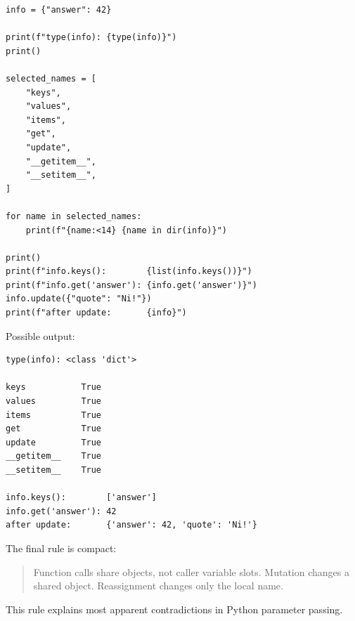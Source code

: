 \begin{verbatim}
info = {"answer": 42}

print(f"type(info): {type(info)}")
print()

selected_names = [
    "keys",
    "values",
    "items",
    "get",
    "update",
    "__getitem__",
    "__setitem__",
]

for name in selected_names:
    print(f"{name:<14} {name in dir(info)}")

print()
print(f"info.keys():        {list(info.keys())}")
print(f"info.get('answer'): {info.get('answer')}")
info.update({"quote": "Ni!"})
print(f"after update:       {info}")
\end{verbatim}

Possible output:

\begin{verbatim}
type(info): <class 'dict'>

keys           True
values         True
items          True
get            True
update         True
__getitem__    True
__setitem__    True

info.keys():        ['answer']
info.get('answer'): 42
after update:       {'answer': 42, 'quote': 'Ni!'}
\end{verbatim}

The final rule is compact:

\begin{quote}
Function calls share objects, not caller variable slots. Mutation changes a shared object. Reassignment changes only the local name.
\end{quote}

This rule explains most apparent contradictions in Python parameter passing.